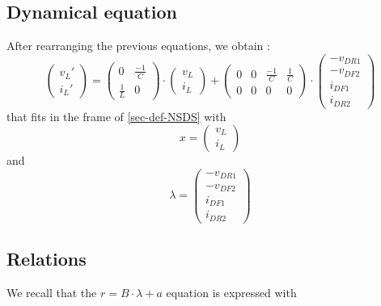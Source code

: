 \documentclass[10pt]{article}
\begin{document}
\subsection{Dynamical equation}
\label{sec-dyn-eq}
After rearranging the previous equations, we obtain :
\[ 
\left( \begin{array}{c}
v_L'\\
i_L'
\end{array} \right)
=
\left( \begin{array}{cc}
0 & \frac{-1}{C}\\
\frac{1}{L} & 0
\end{array} \right)
 \cdot
\left( \begin{array}{c}
v_L\\
i_L
\end{array} \right)
+
\left( \begin{array}{cccc}
0 & 0 & \frac{-1}{C} & \frac{1}{C}\\
0 & 0 & 0 & 0
\end{array} \right)
 \cdot 
\left( \begin{array}{c}
-v_{DR1}\\
-v_{DF2}\\
i_{DF1}\\
i_{DR2}
\end{array} \right)
\]
that fits in the frame of \ref{sec-def-NSDS} with
\[
x = 
\left( \begin{array}{c}
v_L\\
i_L
\end{array} \right)
\]
and 
\[
\lambda = 
\left( \begin{array}{c}
-v_{DR1}\\
-v_{DF2}\\
i_{DF1}\\
i_{DR2}
\end{array} \right)
\]



\subsection{Relations}
We recall that the $r = B \cdot \lambda + a$ equation is expressed with
\end{document}
